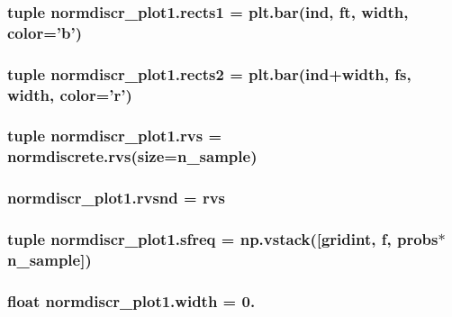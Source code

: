 \subsubsection[{rects1}]{\setlength{\rightskip}{0pt plus 5cm}tuple normdiscr\+\_\+plot1.\+rects1 = {\bf plt.\+bar}({\bf ind}, {\bf ft}, {\bf width}, color='{\bf b}')}\label{namespacenormdiscr__plot1_a2181998588c54cf2e52c63bfd440e939}
\hypertarget{namespacenormdiscr__plot1_a00a3be784e50ee3b07b6a8a9fbf8ba27}{}
\subsubsection[{rects2}]{\setlength{\rightskip}{0pt plus 5cm}tuple normdiscr\+\_\+plot1.\+rects2 = {\bf plt.\+bar}({\bf ind}+{\bf width}, {\bf fs}, {\bf width}, color='{\bf r}')}\label{namespacenormdiscr__plot1_a00a3be784e50ee3b07b6a8a9fbf8ba27}
\hypertarget{namespacenormdiscr__plot1_a611135405e8f549e91423e1afb8548f2}{}
\subsubsection[{rvs}]{\setlength{\rightskip}{0pt plus 5cm}tuple normdiscr\+\_\+plot1.\+rvs = normdiscrete.\+rvs(size={\bf n\+\_\+sample})}\label{namespacenormdiscr__plot1_a611135405e8f549e91423e1afb8548f2}
\hypertarget{namespacenormdiscr__plot1_a26ceeab16d31b28ff8862ced0a45410b}{}
\subsubsection[{rvsnd}]{\setlength{\rightskip}{0pt plus 5cm}normdiscr\+\_\+plot1.\+rvsnd = {\bf rvs}}\label{namespacenormdiscr__plot1_a26ceeab16d31b28ff8862ced0a45410b}
\hypertarget{namespacenormdiscr__plot1_a320997d51e3922fc224dc09a1dc05fc6}{}
\subsubsection[{sfreq}]{\setlength{\rightskip}{0pt plus 5cm}tuple normdiscr\+\_\+plot1.\+sfreq = np.\+vstack(\mbox{[}{\bf gridint}, f, {\bf probs}$\ast${\bf n\+\_\+sample}\mbox{]})}\label{namespacenormdiscr__plot1_a320997d51e3922fc224dc09a1dc05fc6}
\hypertarget{namespacenormdiscr__plot1_a6c937267be6822f1ede0b9b040779f27}{}
\subsubsection[{width}]{\setlength{\rightskip}{0pt plus 5cm}float normdiscr\+\_\+plot1.\+width = 0.}\label{namespacenormdiscr__plot1_a6c937267be6822f1ede0b9b040779f27}
